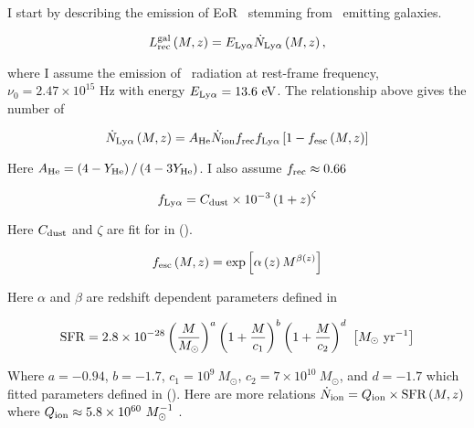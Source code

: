 \label{ref:laes}

I start by describing the emission of EoR \lya\ stemming from \lya\ emitting
galaxies.

\begin{equation}
  L_{\rm rec}^{\rm gal} \left( M, z\right) = E_{\rm Ly\alpha} \dot{N}_{\rm Ly\alpha} \left( M, z\right),
\end{equation}

where I assume the emission of \lya\ radiation at rest-frame frequency, $\nu_0 = 2.47 \times 10^{15}$ Hz
with energy $E_{\rm Ly\alpha} = 13.6 \ {\rm eV}$. The relationship above gives the
number of \lya\ 

\begin{equation}
  \dot{N}_{\rm Ly\alpha} \left( M, z\right) = A_{\rm He} \dot{N}_{\rm ion} f_{\rm rec} f_{\rm Ly\alpha} \left[ 1 - f_{\rm esc} \left( M, z\right) \right]
\end{equation}

Here $A_{\rm He} = \left(4 - Y_{\rm He} \right) / \left( 4 - 3 Y_{\rm He} \right)$. I also assume $f_{\rm rec} \approx 0.66$

\begin{equation}
f_{\rm Ly\alpha} = C_{\rm dust} \times 10^{-3} \left( 1 + z\right)^{\zeta}
\end{equation}

Here $C_{\rm dust}$ and $\zeta$ are fit for in (\cite{2011ApJ...730....8H}).

\begin{equation}
f_{\rm esc} \left( M, z\right) = \exp \left[ \alpha \left(z \right) M^{\beta \left(z \right)} \right]
\end{equation}

Here $\alpha$ and $\beta$ are redshift dependent parameters defined in \cite{2010ApJ...710.1239R}

\begin{equation}
  {\rm SFR} = 2.8 \times 10^{-28} \left(\frac{M}{M_{\odot}} \right)^a \left( 1 + \frac{M}{c_1}\right)^b \left(1 + \frac{M}{c_2} \right)^d \ \left[ M_{\odot} \ {\rm yr}^{-1} \right]
\end{equation}

Where $a = -0.94$, $b = -1.7$, $c_1 = 10^9 \ M_{\odot}$, $c_2 = 7 \times 10^{10} \ M_{\odot}$, and $d = -1.7$ which
fitted parameters defined in (\cite{2013ApJ...763..132S}). Here are more relations $\dot{N}_{\rm ion} = Q_{\rm ion} \times \textrm{SFR} \left(M, z \right)$ where $Q_{\rm ion} \approx 5.8 \times 10^{60} \ M_{\odot}^{-1}$
\cite{2002A&A...382...28S}.

